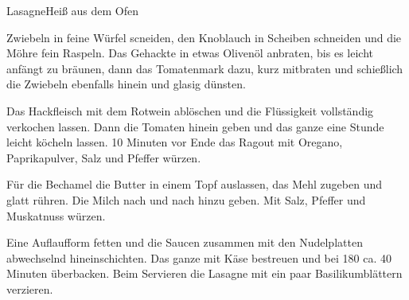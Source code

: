 \begin{recipe}{Lasagne}{Heiß aus dem Ofen}
  \label{Lasagne}
  
  
  
  \steps
  Zwiebeln in feine Würfel scneiden, den Knoblauch in Scheiben schneiden und die Möhre
  fein Raspeln. Das Gehackte in etwas Olivenöl anbraten, bis es leicht anfängt zu bräunen, 
  dann das Tomatenmark dazu, kurz mitbraten und schießlich die Zwiebeln ebenfalls hinein
  und glasig dünsten.

  Das Hackfleisch mit dem Rotwein ablöschen und die Flüssigkeit vollständig verkochen
  lassen. Dann die Tomaten hinein geben und das ganze eine Stunde leicht köcheln lassen.
  10 Minuten vor Ende das Ragout mit Oregano, Paprikapulver, Salz und Pfeffer würzen.

  Für die Bechamel die Butter in einem Topf auslassen, das Mehl zugeben und glatt rühren.
  Die Milch nach und nach hinzu geben. Mit Salz, Pfeffer und Muskatnuss würzen.

  Eine Auflaufform fetten und die Saucen zusammen mit den Nudelplatten abwechselnd
  hineinschichten. Das ganze mit Käse bestreuen und bei 180 \celsius ca. 40 Minuten
  überbacken. Beim Servieren die Lasagne mit ein paar Basilikumblättern verzieren.

\end{recipe}
